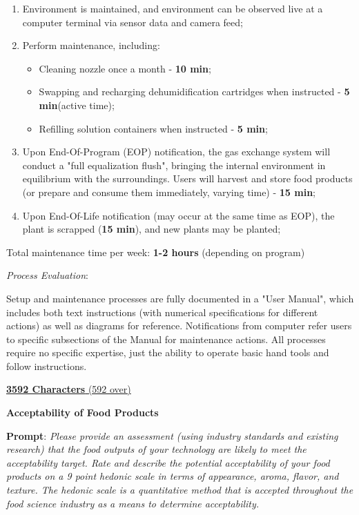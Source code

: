 \documentclass{report}
\begin{document}
\begin{enumerate}
    \item Environment is maintained, and environment can be observed live at a computer terminal via sensor data and camera feed;
    \item Perform maintenance, including:
    \begin{itemize}
        \item Cleaning nozzle once a month - \textbf{10 min}\footnotemark[3];
        \item Swapping and recharging dehumidification cartridges when instructed - \textbf{5 min}\footnotemark[2] (active time);
        \item Refilling solution containers when instructed - \textbf{5 min}\footnotemark[2];
    \end{itemize}
    \item Upon End-Of-Program (EOP) notification, the gas exchange system will conduct a "full equalization flush", bringing the internal environment in equilibrium with the surroundings. Users will harvest and store food products (or prepare and consume them immediately, varying time) - \textbf{15 min}\footnotemark[1];
    \item Upon End-Of-Life notification (may occur at the same time as EOP), the plant is scrapped (\textbf{15 min}), and new plants may be planted;
\end{enumerate}

Total maintenance time per week: \textbf{1-2 hours} (depending on program)

\textit{Process Evaluation}:

Setup and maintenance processes are fully documented in a "User Manual", which includes both text instructions (with numerical specifications for different actions) as well as diagrams for reference. Notifications from computer refer users to specific subsections of the Manual for maintenance actions. All processes require no specific expertise, just the ability to operate basic hand tools and follow instructions.

\uline{\textbf{3592 Characters} (592 over)}

\textbf{Acceptability of Food Products}
\label{sec:acceptability-products}

\textbf{Prompt}: \textit{Please provide an assessment (using industry standards and existing research) that the food outputs of your technology are likely to meet the acceptability target. Rate and describe the potential acceptability of your food products on a 9 point hedonic scale in terms of appearance, aroma, flavor, and texture. The hedonic scale is a quantitative method that is accepted throughout the food science industry as a means to determine acceptability.}
\end{document}
